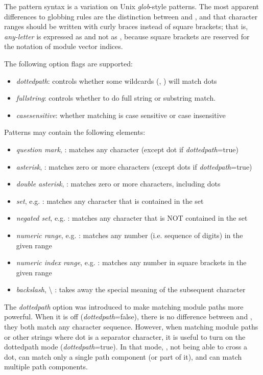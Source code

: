 The pattern syntax is a variation on Unix \textit{glob}-style patterns. The
most apparent differences to globbing rules are the distinction between
\ttt{*} and \ttt{**}, and that character ranges should be written with
curly braces instead of square brackets; that is, \textit{any-letter} is
expressed as  and not as \ttt{[a-zA-Z]}, because square
brackets are reserved for the notation of module vector indices.

The following option flags are supported:

\begin{itemize}
  \item \textit{dottedpath}: controls whether some wildcards (, \ttt{*}) will match dots
  \item \textit{fullstring}: controls whether to do full string or substring match.
  \item \textit{casesensitive}: whether matching is case sensitive or case insensitive
\end{itemize}

Patterns may contain the following elements:

\begin{itemize}
  \item \textit{question mark},  : matches any character (except dot if \textit{dottedpath}=true)
  \item \textit{asterisk}, \ttt{*} : matches zero or more characters (except dots if \textit{dottedpath}=true)
  \item \textit{double asterisk}, \ttt{**} : matches zero or more characters, including dots
  \item \textit{set}, e.g.  : matches any character that is contained in the set
  \item \textit{negated set}, e.g. : matches any character that is NOT contained in the set
  \item \textit{numeric range}, e.g.  : matches any number (i.e. sequence of digits) in the given range
  \item \textit{numeric index range}, e.g. \ttt{[38..150]} : matches any number in square brackets in the given range
  \item \textit{backslash}, {\textbackslash} : takes away the special meaning of the subsequent character
\end{itemize}

\begin{note}
The \textit{dottedpath} option was introduced to make matching {\opp}
module paths more powerful. When it is off (\textit{dottedpath}=false),
there is no difference between \ttt{*} and \ttt{**}, they both match any
character sequence. However, when matching {\opp} module paths or other
strings where dot is a separator character, it is useful to turn on the
dottedpath mode (\textit{dottedpath}=true). In that mode, \ttt{*}, not
being able to cross a dot, can match only a single path component (or part
of it), and \ttt{**} can match multiple path components.
\end{note}

